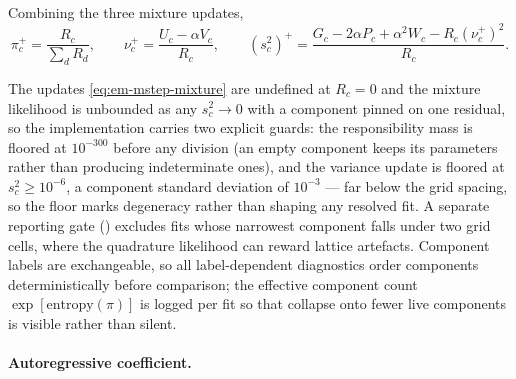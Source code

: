 Combining the three mixture updates,
\begin{equation}
  \boxed{
  \pi_c^{+}
  =
  \frac{R_c}{\sum_d R_d},
  \qquad
  \nu_c^{+}
  =
  \frac{U_c-\alpha V_c}{R_c},
  \qquad
  (s_c^2)^{+}
  =
  \frac{
    G_c-2\alpha P_c+\alpha^2W_c
    -R_c(\nu_c^{+})^2
  }{R_c}.
  }
  \label{eq:em-mstep-mixture}
\end{equation}

\begin{remark}
\label{rmk:em-degeneracy}
The updates \eqref{eq:em-mstep-mixture} are undefined at $R_c = 0$ and the
mixture likelihood is unbounded as any $s_c^2 \to 0$ with a component pinned
on one residual, so the implementation carries two explicit guards: the
responsibility mass is floored at $10^{-300}$ before any division (an empty
component keeps its parameters rather than producing indeterminate ones), and
the variance update is floored at $s_c^2 \geq 10^{-6}$, a component standard
deviation of $10^{-3}$ --- far below the grid spacing, so the floor marks
degeneracy rather than shaping any resolved fit. A separate reporting gate
(\provenanceappendix) excludes fits whose narrowest component falls under two
grid cells, where the quadrature likelihood can reward lattice artefacts.
Component labels are exchangeable, so all label-dependent diagnostics order
components deterministically before comparison; the effective component count
$\exp[\mathrm{entropy}(\pi)]$ is logged per fit so that collapse onto fewer
live components is visible rather than silent.
\end{remark}

\paragraph{Autoregressive coefficient.}

